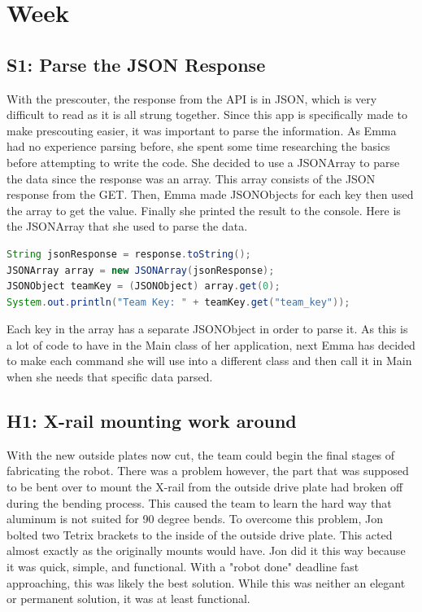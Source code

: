 \documentclass{article}
\begin{document}
\clearpage \newpage \section{Week \thesection} 
\subsection{S1: Parse the JSON Response}

With the prescouter, the response from the API is in JSON, which is very difficult to read as it is all strung together. Since this app is specifically made to make prescouting easier, it was important to parse the information. As Emma had no experience parsing before, she spent some time researching the basics before attempting to write the code. She decided to use a JSONArray to parse the data since the response was an array. This array consists of the JSON response from the GET. Then, Emma made JSONObjects for each key then used the array to get the value. Finally she printed the result to the console. Here is the JSONArray that she used to parse the data. 

\begin{lstlisting}[language=Java]
String jsonResponse = response.toString();
JSONArray array = new JSONArray(jsonResponse);
JSONObject teamKey = (JSONObject) array.get(0);
System.out.println("Team Key: " + teamKey.get("team_key"));

\end{lstlisting}

Each key in the array has a separate JSONObject in order to parse it. As this is a lot of code to have in the Main class of her application, next Emma has decided to make each command she will use into a different class and then call it in Main when she needs that specific data parsed. 
\subsection{H1: X-rail mounting work around}

With the new outside plates now cut, the team could begin the final stages of fabricating the robot. There was a problem however, the part that was supposed to be bent over to mount the X-rail from the outside drive plate had broken off during the bending process. This caused the team to learn the hard way that aluminum is not suited for 90 degree bends. To overcome this problem, Jon bolted two Tetrix brackets to the inside of the outside drive plate. This acted almost exactly as the originally mounts would have. Jon did it this way because it was quick, simple, and functional. With a "robot done" deadline fast approaching, this was likely the best solution. While this was neither an elegant or permanent solution, it was at least functional.
\end{document}
